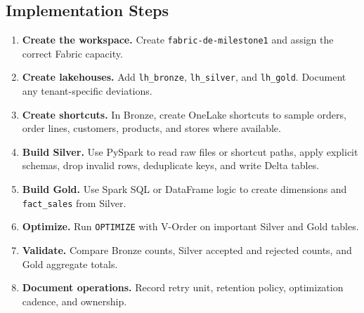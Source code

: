 \subsection*{Implementation Steps}
\begin{enumerate}
    \item \textbf{Create the workspace.} Create \texttt{fabric-de-milestone1} and assign the correct Fabric capacity.
    \item \textbf{Create lakehouses.} Add \texttt{lh\_bronze}, \texttt{lh\_silver}, and \texttt{lh\_gold}. Document any tenant-specific deviations.
    \item \textbf{Create shortcuts.} In Bronze, create OneLake shortcuts to sample orders, order lines, customers, products, and stores where available.
    \item \textbf{Build Silver.} Use PySpark to read raw files or shortcut paths, apply explicit schemas, drop invalid rows, deduplicate keys, and write Delta tables.
    \item \textbf{Build Gold.} Use Spark SQL or DataFrame logic to create dimensions and \texttt{fact\_sales} from Silver.
    \item \textbf{Optimize.} Run \texttt{OPTIMIZE} with V-Order on important Silver and Gold tables.
    \item \textbf{Validate.} Compare Bronze counts, Silver accepted and rejected counts, and Gold aggregate totals.
    \item \textbf{Document operations.} Record retry unit, retention policy, optimization cadence, and ownership.
\end{enumerate}

